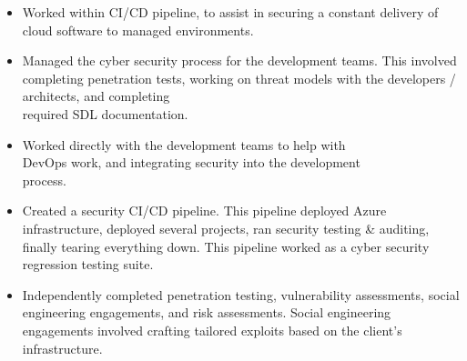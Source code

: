 \documentclass[10pt,a4paper,ragged2e]{rohrbach}
\begin{document}
\begin{paracol}{2}
\divider

\begin{itemize}
\item Worked within CI/CD pipeline, to assist in securing a constant \break delivery of cloud software to managed environments.
\item Managed the cyber security process for the development teams. This involved completing penetration tests, working on threat models with the developers / architects, and completing\\ required SDL documentation. 
\item Worked directly with the development teams to help with\\ DevOps work, and integrating security into the development\\ process.
\item Created a security CI/CD pipeline. This pipeline deployed Azure infrastructure, deployed several projects, ran security testing \& auditing, finally tearing everything down. This pipeline worked as a cyber security regression testing suite.
\end{itemize}




\begin{itemize}
\item Independently completed penetration testing, vulnerability \break assessments, social engineering engagements, and risk assessments. Social engineering engagements involved crafting tailored exploits based on the client’s infrastructure.
\end{itemize}


\end{paracol}
\end{document}
